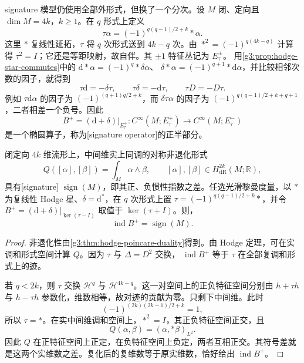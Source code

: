 signature 模型仍使用全部外形式，但换了一个分次。设 \(M\) 闭、定向且 \(\dim M=4k\)，\(k\ge1\)。在 \(q\) 形式上定义
\begin{equation}\label{g3:eq:signature-grading}
	\tau\alpha=(-1)^{q(q-1)/2+k}*\alpha.
\end{equation}
这里 \(*\) 复线性延拓，\(\tau\) 将 \(q\) 次形式送到 \(4k-q\) 次。由
\(*^2=(-1)^{q(4k-q)}\) 计算得 \(\tau^2=I\)；它还是等距映射，故自伴。其 \(\pm1\) 特征丛记为 \(E_\tau^\pm\)。
\ProseParagraphBreak
用\cref{g3:prop:hodge-star-commutes}中的
\(\mathrm d*\alpha=(-1)^q*\delta\alpha\)、
\(\delta*\alpha=(-1)^{q+1}*\mathrm d\alpha\)，并比较相邻次数的因子，就得到
\[
	\tau\mathrm d=-\delta\tau,
	\qquad \tau\delta=-\mathrm d\tau,
	\qquad \tau D=-D\tau.
\]
例如 \(\tau\mathrm d\alpha\) 的因子为
\((-1)^{(q+1)q/2+k}\)，而 \(\delta\tau\alpha\) 的因子为
\((-1)^{q(q-1)/2+k+q+1}\)，二者相差一个负号。因此
\[
	B^+=(\mathrm d+\delta)|_{E_\tau^+}:
	C^\infty(M;E_\tau^+)\longrightarrow C^\infty(M;E_\tau^-)
\]
是一个椭圆算子，称为[signature operator]的正半部分。

\begin{proposition}\label{g3:prop:signature-analytic-index}
	闭定向 \(4k\) 维流形上，中间维实上同调的对称非退化形式
	\[
		Q([\alpha],[\beta])=\int_M\alpha\wedge\beta,
		\qquad [\alpha],[\beta]\in H_{\mathrm{dR}}^{2k}(M;\mathbb R),
	\]
	具有[signature] \(\operatorname{sign}(M)\)，即其正、负惯性指数之差。任选光滑黎曼度量，以 \(*\) 为复线性 Hodge 星、\(\delta=\mathrm d^*\)，在 \(q\) 次形式上置 \(\tau=(-1)^{q(q-1)/2+k}*\)，并令 \(B^+=(\mathrm d+\delta)|_{\ker(\tau-I)}\) 取值于 \(\ker(\tau+I)\)。则，
	\[
		\operatorname{ind}B^+=\operatorname{sign}(M).
	\]
\end{proposition}
\begin{proof}
	非退化性由\cref{g3:thm:hodge-poincare-duality}得到。由 Hodge 定理，可在实调和形式空间计算 \(Q\)。因为 \(\tau\) 与 \(\Delta=D^2\) 交换，
	\(\operatorname{ind}B^+\) 等于 \(\tau\) 在全部复调和形式上的迹。

	若 \(q<2k\)，则 \(\tau\) 交换 \(\mathcal H^q\) 与 \(\mathcal H^{4k-q}\)。这一对空间上的正负特征空间分别由 \(h+\tau h\) 与 \(h-\tau h\) 参数化，维数相等，故对迹的贡献为零。只剩下中间维。此时
	\[
		(-1)^{(2k)(2k-1)/2+k}=1,
	\]
	所以 \(\tau=*\)。在实中间维调和空间上，\(*^2=I\)，其正负特征空间正交，且
	\[
		Q(\alpha,\beta)=(\alpha,*\beta)_{L^2}.
	\]
	因此 \(Q\) 在正特征空间上正定，在负特征空间上负定，两者互相正交。其符号差就是这两个实维数之差。复化后的复维数等于原实维数，恰好给出 \(\operatorname{ind}B^+\)。
\end{proof}

